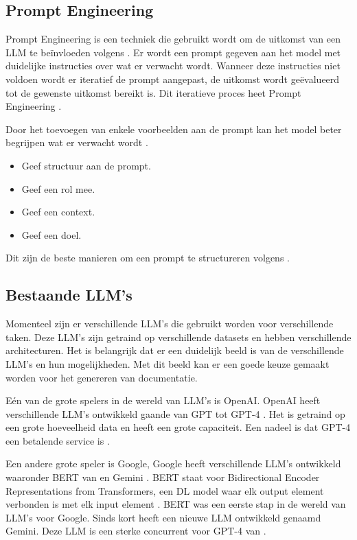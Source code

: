 \subsection{Prompt Engineering}
\label{sec:prompt-engineering}

Prompt Engineering is een techniek die gebruikt wordt om de uitkomst van een LLM te beïnvloeden volgens \textcite{Google2023}.
Er wordt een prompt gegeven aan het model met duidelijke instructies over wat er verwacht wordt. 
Wanneer deze instructies niet voldoen wordt er iteratief de prompt aangepast, de uitkomst wordt geëvalueerd tot de gewenste uitkomst bereikt is. 
Dit iteratieve proces heet Prompt Engineering \autocite{Trad2024}.

Door het toevoegen van enkele voorbeelden aan de prompt kan het model beter begrijpen wat er verwacht wordt \autocite{OpenAi2024a}.
\begin{itemize}
  \item Geef structuur aan de prompt.
  \item Geef een rol mee.
  \item Geef een context.
  \item Geef een doel.
\end{itemize} 
Dit zijn de beste manieren om een prompt te structureren volgens \autocite{Google2023}.

\subsection{Bestaande LLM's}
\label{sec:bestaande-llms}

Momenteel zijn er verschillende LLM's die gebruikt worden voor verschillende taken.
Deze LLM's zijn getraind op verschillende datasets en hebben verschillende architecturen.
Het is belangrijk dat er een duidelijk beeld is van de verschillende LLM's en hun mogelijkheden. 
Met dit beeld kan er een goede keuze gemaakt worden voor het genereren van documentatie.

Eén van de grote spelers in de wereld van LLM's is OpenAI. OpenAI heeft verschillende LLM's ontwikkeld gaande van GPT \autocite{RandfordEtAL2018} tot GPT-4 \autocite{OpenAI2023}.
Het is getraind op een grote hoeveelheid data en heeft een grote capaciteit.
Een nadeel is dat GPT-4 een betalende service is \autocite{OpenAI2023}.

Een andere grote speler is Google, Google heeft verschillende LLM's ontwikkeld waaronder BERT van \textcite{DevlinEtAl2019} en Gemini \autocite{Google2024}.
BERT staat voor Bidirectional Encoder Representations from Transformers, een DL model waar elk output element verbonden is met elk input element \autocite{HashemiPour2024}.
BERT was een eerste stap in de wereld van LLM's voor Google. Sinds kort heeft \textcite{Google2024} een nieuwe LLM ontwikkeld genaamd Gemini.
Deze LLM is een sterke concurrent voor GPT-4 van \textcite{OpenAI2023}. 

